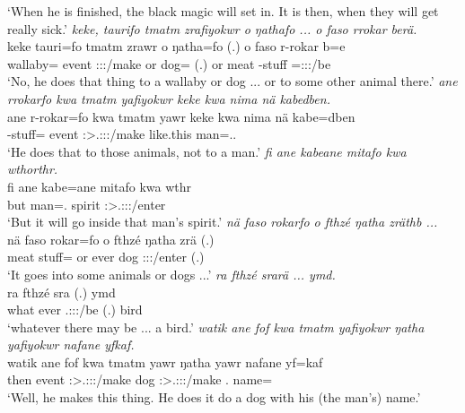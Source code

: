 \begin{exe}
	\trans `When he is finished, the black magic will set in. It is then, when they will get really sick.'
	\emph{keke, taurifo tmatm zrafiyokwr o ŋathafo ... o faso rrokar berä.}\\
	\gll keke tauri=fo tmatm zrawr o ŋatha=fo (.) o faso r-rokar b=e\\
	{\Neg} wallaby={\All} event \Stsg:\Sbj:\Irr:\Ipfv/make or dog={\All} (.) or meat \Redup-stuff \Med=\Stpl:\Sbj:\Nonpast:\Ipfv/be\\
	\trans `No, he does that thing to a wallaby or dog ... or to some other animal there.'
	\emph{ane rrokarfo kwa tmatm yafiyokwr keke kwa nima nä kabedben.}\\
	\gll ane r-rokar=fo kwa tmatm yawr keke kwa nima nä kabe=dben\\
	{\Dem} \Redup-stuff={\All} {\Fut} event \Stsg:\Sbj>\Tsg.\Masc:\Io:\Nonpast:\Ipfv/make {\Neg} {\Fut} like.this {\Indf} man=\Loc.\Anim.\Sg\\
	\trans `He does that to those animals, not to a man.'
	\emph{fi ane kabeane mitafo kwa wthorthr.}\\
	\gll fi ane kabe=ane mitafo kwa wthr\\
	but {\Dem} man=\Poss.{\Sg} spirit {\Fut} \Stsg:\Sbj>\Tsg.\F:\Obj:\Nonpast:\Ipfv/enter\\
	\trans `But it will go inside that man's spirit.'
	\emph{nä faso rokarfo o fthzé ŋatha zräthb ...}\\
	\gll nä faso rokar=fo o fthzé ŋatha zrä (.)\\
	{\Indf} meat stuff={\All} or ever dog \Stsg:\Sbj:\Nonpast:\Pfv/enter (.)\\
	\trans `It goes into some animals or dogs ...'
	\emph{ra fthzé srarä ... ymd.}\\
	\gll ra fthzé sra (.) ymd\\
	what ever \Tsg.\Masc:\Sbj:\Irr:\Ipfv/be (.) bird\\
	\trans `whatever there may be ... a bird.'
	\emph{watik ane fof kwa tmatm yafiyokwr ŋatha yafiyokwr nafane yfkaf.}\\
	\gll watik ane fof kwa tmatm yawr ŋatha yawr nafane yf=kaf\\
	then {\Dem} {\Emph} {\Fut} event \Stsg:\Sbj>\Tsg.\Masc:\Io:\Nonpast:\Ipfv/make dog \Stsg:\Sbj>\Tsg.\Masc:\Io:\Nonpast:\Ipfv/make \Tsg.{\Poss} name=\Prop\\
	\trans `Well, he makes this thing. He does it do a dog with his (the man's) name.'

\end{exe}
